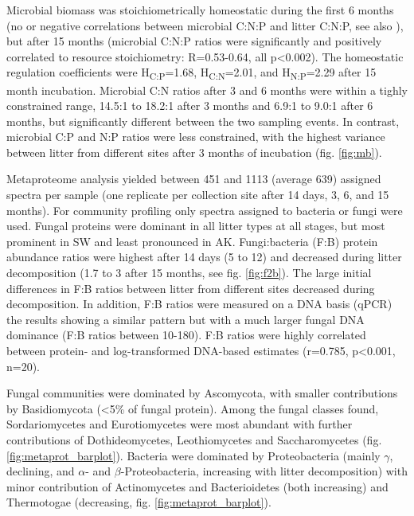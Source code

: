 Microbial biomass was stoichiometrically homeostatic during the first 6 months (no or negative correlations between microbial C:N:P and litter C:N:P, see also \cite{Mooshammer2011}), but after 15 months (microbial C:N:P ratios were significantly and positively correlated to resource stoichiometry: R=0.53-0.64, all p\textless 0.002). The homeostatic regulation coefficients \cite{Sterner2002} were H\textsubscript{C:P}=1.68, H\textsubscript {C:N}=2.01, and H\textsubscript{N:P}=2.29 after 15 month incubation. Microbial C:N ratios after 3 and 6 months were within a tighly constrained range, 14.5:1 to 18.2:1 after 3 months and 6.9:1 to 9.0:1 after 6 months, but significantly different between the two sampling events. In contrast, microbial C:P and N:P ratios were less constrained, with the highest variance between litter from different sites after 3 months of incubation (fig. \ref{fig:mb}).

Metaproteome analysis yielded between 451 and 1113 (average 639) assigned spectra per sample (one replicate per collection site after 14 days, 3, 6, and 15 months). For community profiling only spectra assigned to bacteria or fungi were used. Fungal proteins were dominant in all litter types at all stages, but most prominent in SW and least pronounced in  AK. Fungi:bacteria (F:B) protein abundance ratios were highest after 14 days (5 to 12) and decreased during litter decomposition (1.7 to 3 after 15 months, see fig. \ref{fig:f2b}). The large initial differences in F:B ratios between litter from different sites decreased during decomposition. In addition, F:B ratios were measured on a DNA basis (qPCR) the results showing a similar pattern but with a much larger fungal DNA dominance (F:B ratios between 10-180). F:B ratios were highly correlated between protein- and log-transformed DNA-based estimates (r=0.785, p\textless 0.001, n=20).

Fungal communities were dominated by Ascomycota, with smaller contributions by Basidiomycota (<5\% of fungal protein).  Among the fungal classes found, Sordariomycetes and Eurotiomycetes were most abundant with further contributions of Dothideomycetes, Leothiomycetes and Saccharomycetes (fig. \ref{fig:metaprot_barplot}). Bacteria were dominated by Proteobacteria (mainly $\gamma$, declining, and $\alpha$- and $\beta$-Proteobacteria, increasing with litter decomposition) with minor contribution of Actinomycetes and Bacterioidetes (both increasing) and Thermotogae (decreasing, fig. \ref{fig:metaprot_barplot}).

